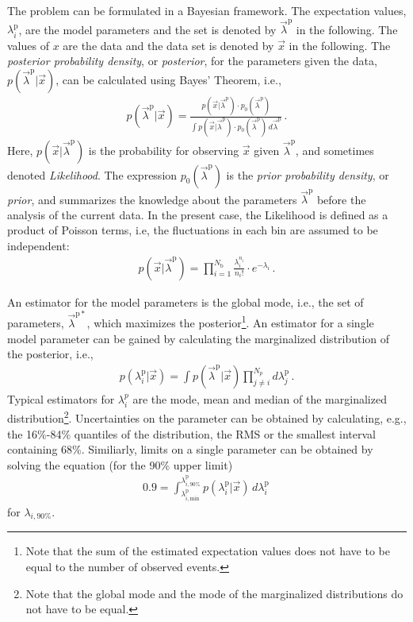 \documentclass[11pt, a4paper]{article}
\begin{document}
The problem can be formulated in a Bayesian framework. The expectation
values, $\lambda_{i}^{\mathrm{p}}$, are the model parameters and the
set is denoted by $\vec{\lambda}^{\mathrm{p}}$ in the following. The
values of $x$ are the data and the data set is denoted by $\vec{x}$ in
the following. The {\it posterior probability density}, or {\it
posterior}, for the parameters given the data,
$p(\vec{\lambda}^{\mathrm{p}}|\vec{x})$, can be calculated using
Bayes' Theorem, i.e.,
%
\begin{eqnarray}
p(\vec{\lambda}^{\mathrm{p}}|\vec{x}) = \frac{p(\vec{x}|\vec{\lambda}^{\mathrm{p}}) \cdot p_{0}(\vec{\lambda}^{\mathrm{p}})}{\int p(\vec{x}|\vec{\lambda}^{\mathrm{p}}) \cdot p_{0}(\vec{\lambda}^{\mathrm{p}}) \, d\vec{\lambda}^{\mathrm{p}}} \, .
\label{eqn:bayes}
\end{eqnarray}
%
Here, $p(\vec{x}|\vec{\lambda}^{\mathrm{p}})$ is the probability for
observing $\vec{x}$ given $\vec{\lambda}^{\mathrm{p}}$, and sometimes
denoted {\it Likelihood}. The expression
$p_{0}(\vec{\lambda}^{\mathrm{p}})$ is the {\it prior probability
density}, or {\it prior}, and summarizes the knowledge about the
parameters $\vec{\lambda}^{\mathrm{p}}$ before the analysis of the
current data. In the present case, the Likelihood is defined as a
product of Poisson terms, i.e, the fluctuations in each bin are
assumed to be independent:
%
\begin{eqnarray*}
p(\vec{x}|\vec{\lambda}^{\mathrm{p}}) = \prod_{i=1}^{N_{\mathrm{b}}} \frac{\lambda_{i}^{n_{i}}}{n_{i}!} \cdot e^{-\lambda_{i}} \, .
\end{eqnarray*}

An estimator for the model parameters is the global mode, i.e., the
set of parameters, $\vec{\lambda}^{\mathrm{p}*}$, which maximizes the
posterior\footnote{Note that the sum of the estimated expectation
values does not have to be equal to the number of observed
events.}. An estimator for a single model parameter can be gained by
calculating the marginalized distribution of the posterior, i.e.,
%
\begin{eqnarray}
p(\lambda_{i}^{\mathrm{p}}|\vec{x}) = \int p(\vec{\lambda}^{\mathrm{p}}|\vec{x}) \prod
_{j \ne i}^{N_{p}} d\lambda_{j}^{\mathrm{p}} \, .
\end{eqnarray}
%
Typical estimators for $\lambda_{i}^{p}$ are the mode, mean and median
of the marginalized distribution\footnote{Note that the global mode
and the mode of the marginalized distributions do not have to be
equal.}. Uncertainties on the parameter can be obtained by
calculating, e.g., the 16\%-84\% quantiles of the distribution, the
RMS or the smallest interval containing 68\%. Similiarly, limits on a
single parameter can be obtained by solving the equation (for the 90\%
upper limit)
%
\begin{eqnarray}
0.9 = \int_{\lambda_{i, \mathrm{min}}^{\mathrm{p}}}^{\lambda_{i,
    \mathrm{90\%}}^{\mathrm{p}}} p(\lambda_{i}^{\mathrm{p}}|\vec{x})
\, d\lambda_{i}^{\mathrm{p}} \, 
\end{eqnarray}
%
for $\lambda_{i, \mathrm{90\%}}$.
\end{document}
